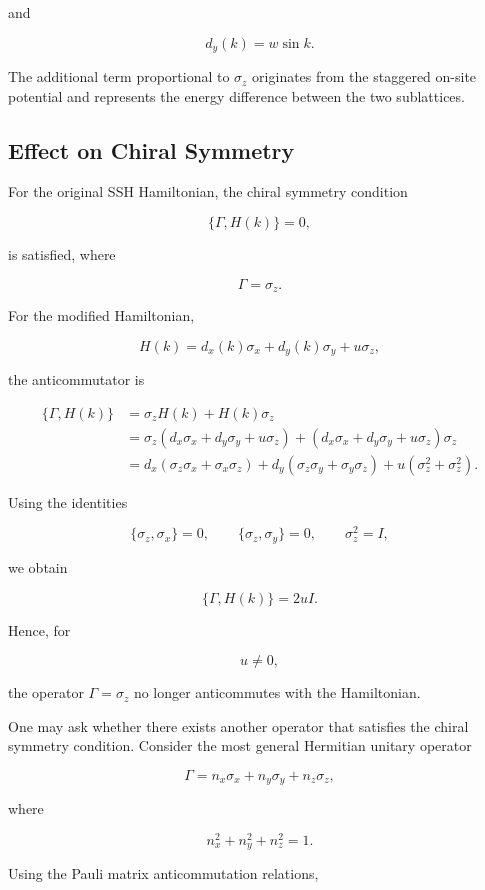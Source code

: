 \documentclass[11pt, a4paper]{article}
\begin{document}
and

\[
d_y(k)=w\sin k.
\]

The additional term proportional to $\sigma_z$ originates from the staggered
on-site potential and represents the energy difference between the two
sublattices.

\subsection{Effect on Chiral Symmetry}

For the original SSH Hamiltonian, the chiral symmetry condition

\[
\{\Gamma,H(k)\}=0,
\]

is satisfied, where

\[
\Gamma=\sigma_z.
\]

For the modified Hamiltonian,

\[
H(k)
=
d_x(k)\sigma_x
+
d_y(k)\sigma_y
+
u\sigma_z,
\]

the anticommutator is

\begin{align}
\{\Gamma,H(k)\}
&=
\sigma_zH(k)+H(k)\sigma_z
\\
&=
\sigma_z
\left(
d_x\sigma_x+d_y\sigma_y+u\sigma_z
\right)
+
\left(
d_x\sigma_x+d_y\sigma_y+u\sigma_z
\right)
\sigma_z
\\
&=
d_x(\sigma_z\sigma_x+\sigma_x\sigma_z)
+
d_y(\sigma_z\sigma_y+\sigma_y\sigma_z)
+
u(\sigma_z^2+\sigma_z^2).
\end{align}

Using the identities

\[
\{\sigma_z,\sigma_x\}=0,\qquad
\{\sigma_z,\sigma_y\}=0,\qquad
\sigma_z^2=I,
\]

we obtain

\[
\{\Gamma,H(k)\}=2uI.
\]

Hence, for

\[
u\neq0,
\]

the operator $\Gamma=\sigma_z$ no longer anticommutes with the Hamiltonian.

One may ask whether there exists another operator that satisfies the chiral
symmetry condition. Consider the most general Hermitian unitary operator

\[
\Gamma
=
n_x\sigma_x+n_y\sigma_y+n_z\sigma_z,
\]

where

\[
n_x^2+n_y^2+n_z^2=1.
\]

Using the Pauli matrix anticommutation relations,
\end{document}

